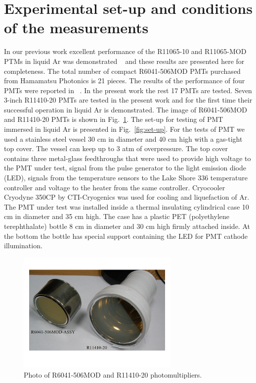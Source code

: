 \documentclass[a4paper,11pt]{article}
\begin{document}
\section{Experimental set-up and conditions of the measurements}

In our previous work  excellent performance of the R11065-10 and R11065-MOD PTMs
in liquid Ar was demonstrated ~\cite{CryoPMT1} and these results are presented here for completeness.  The total number of compact 
R6041-506MOD PMTs purchased from Hamamatsu Photonics  is 21 pieces. The results of the performance  of four PMTs 
were reported in ~\cite{CryoPMT1}. In the present  work the rest 17 PMTs are tested.  Seven 3-inch R11410-20 PMTs are tested 
in the present work and for the first time their successful operation in liquid Ar is demonstrated.  
The image of  R6041-506MOD and R11410-20 PMTs is shown in Fig.~\ref{fig:PMTs}. The set-up for testing of PMT immersed 
in liquid Ar is presented in Fig.~\ref{fig:set-up}. For the tests of PMT we used a stainless steel vessel 30 cm in diameter and 
40 cm high with a gas-tight top cover. The vessel can keep up to 3 atm of overpressure. The top cover contains 
three metal-glass feedthroughs that were used to provide high voltage to the PMT under test, signal from the pulse 
generator to the light emission diode (LED), signals from the temperature sensors to the Lake Shore 336 temperature controller 
and voltage to the heater from the same controller. Cryocooler Cryodyne 350CP by CTI-Cryogenics was used 
for cooling and liquefaction of Ar. The PMT under test was installed inside a thermal insulating cylindrical case 
10 cm in diameter and 35 cm high. The case has a plastic PET (polyethylene terephthalate) bottle 8 cm in diameter and
30 cm high firmly attached inside. At the bottom the bottle has special support containing the LED for PMT cathode illumination.
\begin{figure}[htbp]
\centering
\includegraphics[width=0.7\textwidth,viewport=1 1 700 500,clip]{figures/PMTs.png}
\caption{Photo of R6041-506MOD and R11410-20 photomultipliers.}
\label{fig:PMTs}
\end{figure}
\end{document}

